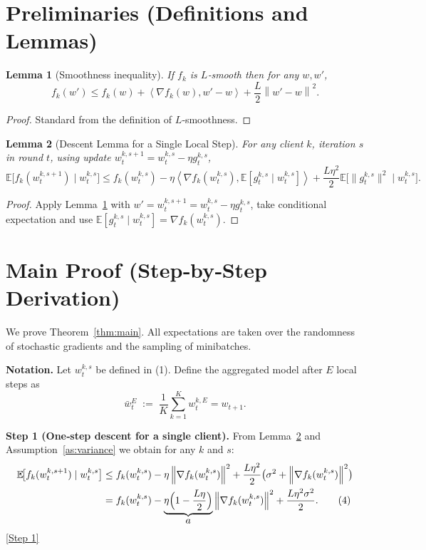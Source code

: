 \documentclass{article}
\newtheorem{lemma}{Lemma}
\newcommand{\EE}{\mathbb{E}}
\newcommand{\norm}[1]{\left\lVert#1\right\rVert}
\newcommand{\inner}[2]{\left\langle #1,#2\right\rangle}
\begin{document}
\newpage
\section*{Preliminaries (Definitions and Lemmas)}
\begin{lemma}[Smoothness inequality]\label{lem:smooth}
If $f_k$ is $L$‑smooth then for any $w,w'$,
\[
f_k(w')\le f_k(w)+\inner{\nabla f_k(w)}{w'-w}+\frac{L}{2}\norm{w'-w}^2 .
\]
\end{lemma}
\begin{proof}
Standard from the definition of $L$‑smoothness. \qedhere
\end{proof}

\begin{lemma}[Descent Lemma for a Single Local Step]\label{lem:local-descent}
For any client $k$, iteration $s$ in round $t$, using update $w_{t}^{k,s+1}=w_{t}^{k,s}-\eta g_{t}^{k,s}$,
\[
\EE\!\bigl[f_k(w_{t}^{k,s+1})\mid w_{t}^{k,s}\bigr]
\le
f_k(w_{t}^{k,s})-\eta\inner{\nabla f_k(w_{t}^{k,s})}{\EE[g_{t}^{k,s}\mid w_{t}^{k,s}]}
+\frac{L\eta^2}{2}\EE\!\bigl[\|g_{t}^{k,s}\|^2\mid w_{t}^{k,s}\bigr].
\]
\end{lemma}
\begin{proof}
Apply Lemma~\ref{lem:smooth} with $w'=w_{t}^{k,s+1}=w_{t}^{k,s}-\eta g_{t}^{k,s}$, take conditional expectation and use $\EE[g_{t}^{k,s}\mid w_{t}^{k,s}]=\nabla f_k(w_{t}^{k,s})$. \qedhere
\end{proof}

\section*{Main Proof (Step‑by‑Step Derivation)}
We prove Theorem~\ref{thm:main}.  
All expectations are taken over the randomness of stochastic gradients and the sampling of minibatches.

\noindent\textbf{Notation.}  
Let $w_{t}^{k,s}$ be defined in (1).  
Define the aggregated model after $E$ local steps as
\[
\bar w_{t}^{E}\;:=\;\frac1K\sum_{k=1}^{K}w_{t}^{k,E}=w_{t+1}.
\]

\bigskip
\noindent\textbf{Step 1 (One‑step descent for a single client).}  
From Lemma~\ref{lem:local-descent} and Assumption~\ref{as:variance} we obtain for any $k$ and $s$:
\begin{align}
\EE\!\bigl[f_k(w_{t}^{k,s+1})\mid w_{t}^{k,s}\bigr]
&\le f_k(w_{t}^{k,s})
-\eta \norm{\nabla f_k(w_{t}^{k,s})}^2
+\frac{L\eta^2}{2}\bigl(\sigma^2+\norm{\nabla f_k(w_{t}^{k,s})}^2\bigr) \nonumber\\
&= f_k(w_{t}^{k,s})-\underbrace{\eta\Bigl(1-\frac{L\eta}{2}\Bigr)}_{\displaystyle a}\norm{\nabla f_k(w_{t}^{k,s})}^2
+\frac{L\eta^2\sigma^2}{2}.
\tag{4}
\end{align}
\underline{[Step 1]}
\end{document}
